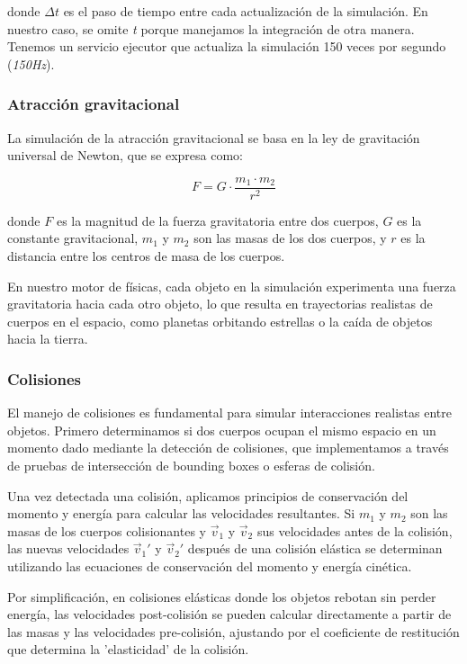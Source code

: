 donde \(\Delta t\) es el paso de tiempo entre cada actualización de la simulación. En nuestro caso, se omite \textit{t} porque manejamos la integración de otra manera. Tenemos un servicio ejecutor que actualiza la simulación 150 veces por segundo (\textit{150Hz}).

\subsubsection{Atracción gravitacional}
La simulación de la atracción gravitacional se basa en la ley de gravitación universal de Newton, que se expresa como:

\begin{equation}
\label{eq3}
    F = G \cdot \frac{m_1 \cdot m_2}{r^2}
\end{equation}

donde \(F\) es la magnitud de la fuerza gravitatoria entre dos cuerpos, \(G\) es la constante gravitacional, \(m_1\) y \(m_2\) son las masas de los dos cuerpos, y \(r\) es la distancia entre los centros de masa de los cuerpos.

En nuestro motor de físicas, cada objeto en la simulación experimenta una fuerza gravitatoria hacia cada otro objeto, lo que resulta en trayectorias realistas de cuerpos en el espacio, como planetas orbitando estrellas o la caída de objetos hacia la tierra.

\subsubsection{Colisiones}
El manejo de colisiones es fundamental para simular interacciones realistas entre objetos. Primero determinamos si dos cuerpos ocupan el mismo espacio en un momento dado mediante la detección de colisiones, que implementamos a través de pruebas de intersección de bounding boxes o esferas de colisión.

Una vez detectada una colisión, aplicamos principios de conservación del momento y energía para calcular las velocidades resultantes. Si \(m_1\) y \(m_2\) son las masas de los cuerpos colisionantes y \(\vec{v}_1\) y \(\vec{v}_2\) sus velocidades antes de la colisión, las nuevas velocidades \(\vec{v}_1'\) y \(\vec{v}_2'\) después de una colisión elástica se determinan utilizando las ecuaciones de conservación del momento y energía cinética.

Por simplificación, en colisiones elásticas donde los objetos rebotan sin perder energía, las velocidades post-colisión se pueden calcular directamente a partir de las masas y las velocidades pre-colisión, ajustando por el coeficiente de restitución que determina la 'elasticidad' de la colisión.


